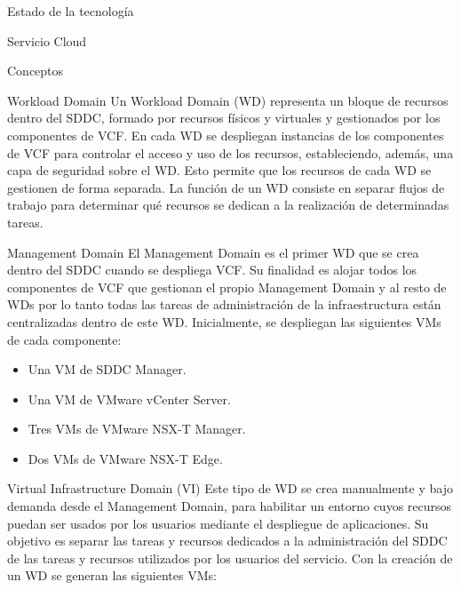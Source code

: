 \begin{chapter}{Estado de la tecnología}
\begin{section}{Servicio Cloud}
\begin{subsection}{Conceptos}
        
        \begin{subsubsection}{Workload Domain}
        Un Workload Domain (WD) representa un bloque de recursos dentro del SDDC, formado por recursos físicos y virtuales y gestionados por los componentes de VCF. En cada WD se despliegan instancias de los componentes de VCF para controlar el acceso y uso de los recursos, estableciendo, además, una capa de seguridad sobre el WD. Esto permite que los recursos de cada WD se gestionen de forma separada. La función de un WD consiste en separar flujos de trabajo para determinar qué recursos se dedican a la realización de determinadas tareas.
        \end{subsubsection}
        \begin{subsubsection}{Management Domain}
        \label{subsubsec:domainManagement}
        El Management Domain es el primer WD que se crea dentro del SDDC cuando se despliega VCF. Su finalidad es alojar todos los componentes de VCF que gestionan el propio Management Domain y al resto de WDs por lo tanto todas las tareas de administración de la infraestructura están centralizadas dentro de este WD. Inicialmente, se despliegan las siguientes VMs de cada componente:
        \begin{itemize}
          \item Una VM de SDDC Manager.
          \item Una VM de VMware vCenter Server.
          \item Tres VMs de VMware NSX-T Manager.
          \item Dos VMs de VMware NSX-T Edge.
        \end{itemize}
        \end{subsubsection}        
        \begin{subsubsection}{Virtual Infrastructure Domain (VI)}
        \label{subsubsec:domainVI}
        Este tipo de WD se crea manualmente y bajo demanda desde el Management Domain, para habilitar un entorno cuyos recursos puedan ser usados por los usuarios mediante el despliegue de aplicaciones. Su objetivo es separar las tareas y recursos dedicados a la administración del SDDC de las tareas y recursos utilizados por los usuarios del servicio. Con la creación de un WD se generan las siguientes VMs:

\end{subsubsection}
\end{subsection}
\end{section}
\end{chapter}
